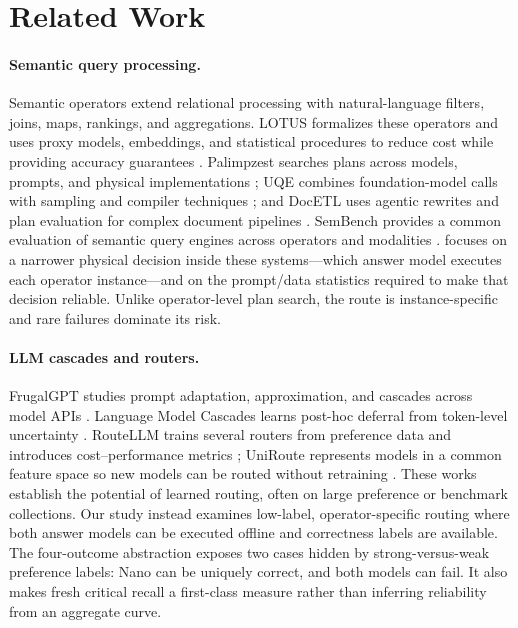 \section{Related Work}
\label{sec:related}

\paragraph{Semantic query processing.}
Semantic operators extend relational processing with natural-language filters,
joins, maps, rankings, and aggregations. LOTUS formalizes these operators and
uses proxy models, embeddings, and statistical procedures to reduce cost while
providing accuracy guarantees \cite{patel2025lotus}. Palimpzest searches plans
across models, prompts, and physical implementations
\cite{liu2025palimpzest}; UQE combines foundation-model calls with sampling and
compiler techniques \cite{dai2024uqe}; and DocETL uses agentic rewrites and
plan evaluation for complex document pipelines \cite{shankar2025docetl}.
SemBench provides a common evaluation of semantic query engines across
operators and modalities \cite{lao2026sembench}. \system focuses on a narrower
physical decision inside these systems---which answer model executes each
operator instance---and on the prompt/data statistics required to make that
decision reliable. Unlike operator-level plan search, the route is
instance-specific and rare failures dominate its risk.

\paragraph{LLM cascades and routers.}
FrugalGPT studies prompt adaptation, approximation, and cascades across model
APIs \cite{chen2024frugalgpt}. Language Model Cascades learns post-hoc deferral
from token-level uncertainty \cite{gupta2024cascades}. RouteLLM trains several
routers from preference data and introduces cost--performance metrics
\cite{ong2025routellm}; UniRoute represents models in a common feature space so
new models can be routed without retraining \cite{jitkrittum2026uniroute}.
These works establish the potential of learned routing, often on large
preference or benchmark collections. Our study instead examines low-label,
operator-specific routing where both answer models can be executed offline and
correctness labels are available. The four-outcome abstraction exposes two
cases hidden by strong-versus-weak preference labels: Nano can be uniquely
correct, and both models can fail. It also makes fresh critical recall a
first-class measure rather than inferring reliability from an aggregate curve.

